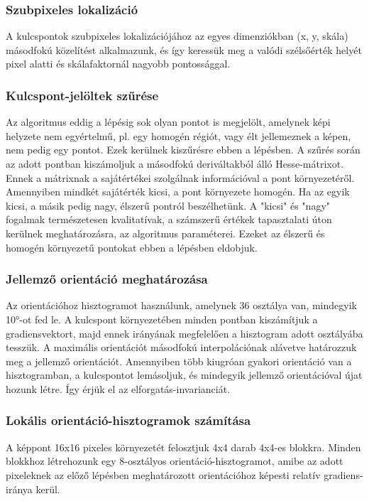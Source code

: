 	\subsubsection{Szubpixeles lokalizáció}
	A kulcspontok szubpixeles lokalizációjához az egyes dimenziókban (x, y, skála) másodfokú közelítést alkalmazunk, és így keressük meg a valódi szélsőérték helyét pixel alatti és skálafaktornál nagyobb pontossággal.
	
	\subsubsection{Kulcspont-jelöltek szűrése}
	Az algoritmus eddig a lépésig sok olyan pontot is megjelölt, amelynek képi helyzete nem egyértelmű, pl. egy homogén régiót, vagy élt jellemeznek a képen, nem pedig egy pontot. Ezek kerülnek kiszűrésre ebben a lépésben. A szűrés során az adott pontban kiszámoljuk a másodfokú deriváltakból álló Hesse-mátrixot. Ennek a mátrixnak a sajátértékei szolgálnak információval a pont környezetéről. Amennyiben mindkét sajátérték kicsi, a pont környezete homogén. Ha az egyik kicsi, a másik pedig nagy, élszerű pontról beszélhetünk. A "kicsi" és "nagy" fogalmak természetesen kvalitatívak, a számszerű értékek tapasztalati úton kerülnek meghatározásra, az algoritmus paraméterei. Ezeket az élszerű és homogén környezetű pontokat ebben a lépésben eldobjuk.
	
	\subsubsection{Jellemző orientáció meghatározása}
	Az orientációhoz hisztogramot használunk, amelynek 36 osztálya van, mindegyik 10°-ot fed le. A kulcspont környezetében minden pontban kiszámítjuk a gradiensvektort, majd ennek irányának megfelelően a hisztogram adott osztályába tesszük. A maximális orientációt másodfokú interpolációnak alávetve határozzuk meg a jellemző orientációt. Amennyiben több kiugróan gyakori orientáció van a hisztogramban, a kulcspontot lemásoljuk, és mindegyik jellemző orientációval újat hozunk létre. Így érjük el az elforgatás-invarianciát.
	
	\subsubsection{Lokális orientáció-hisztogramok számítása}
	A képpont 16x16 pixeles környezetét felosztjuk 4x4 darab 4x4-es blokkra. Minden blokkhoz létrehozunk egy 8-osztályos orientáció-hisztogramot, amibe az adott pixeleknek az előző lépésben meghatározott orientációhoz képesti relatív gradiens-iránya kerül.
	
